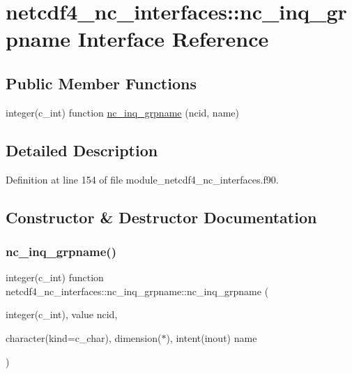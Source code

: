 \hypertarget{interfacenetcdf4__nc__interfaces_1_1nc__inq__grpname}{}\section{netcdf4\+\_\+nc\+\_\+interfaces\+:\+:nc\+\_\+inq\+\_\+grpname Interface Reference}
\label{interfacenetcdf4__nc__interfaces_1_1nc__inq__grpname}
\subsection*{Public Member Functions}
\begin{DoxyCompactItemize}
\item 
integer(c\+\_\+int) function \hyperlink{interfacenetcdf4__nc__interfaces_1_1nc__inq__grpname_a97817c5918eb6ef6fb8a89a5ad2b8ff9}{nc\+\_\+inq\+\_\+grpname} (ncid, name)
\end{DoxyCompactItemize}


\subsection{Detailed Description}


Definition at line 154 of file module\+\_\+netcdf4\+\_\+nc\+\_\+interfaces.\+f90.



\subsection{Constructor \& Destructor Documentation}
\mbox{\label{interfacenetcdf4__nc__interfaces_1_1nc__inq__grpname_a97817c5918eb6ef6fb8a89a5ad2b8ff9}} 
\subsubsection{\texorpdfstring{nc\+\_\+inq\+\_\+grpname()}{nc\_inq\_grpname()}}
{\footnotesize\ttfamily integer(c\+\_\+int) function netcdf4\+\_\+nc\+\_\+interfaces\+::nc\+\_\+inq\+\_\+grpname\+::nc\+\_\+inq\+\_\+grpname (\begin{DoxyParamCaption}\item[{integer(c\+\_\+int), value}]{ncid,  }\item[{character(kind=c\+\_\+char), dimension($\ast$), intent(inout)}]{name }\end{DoxyParamCaption})}




